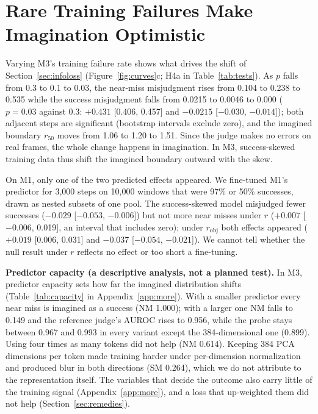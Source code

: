 \documentclass[10pt]{article}
\newcommand{\rob}{r_{\mathrm{obj}}}
\begin{document}
\section{Rare Training Failures Make Imagination Optimistic}
\label{sec:skew}

Varying M3's training failure rate shows what drives the shift of Section~\ref{sec:infoloss} (Figure~\ref{fig:curves}c; H4a in Table~\ref{tab:tests}). As $p$ falls from 0.3 to 0.1 to 0.03, the near-miss misjudgment rises from 0.104 to 0.238 to 0.535 while the success misjudgment falls from 0.0215 to 0.0046 to 0.000 ($p=0.03$ against 0.3: $+0.431$ [0.406, 0.457] and $-0.0215$ [$-0.030$, $-0.014$]); both adjacent steps are significant (bootstrap intervals exclude zero), and the imagined boundary $r_{50}$ moves from 1.06 to 1.20 to 1.51. Since the judge makes no errors on real frames, the whole change happens in imagination. In M3, success-skewed training data thus shift the imagined boundary outward with the skew.

On M1, only one of the two predicted effects appeared. We fine-tuned M1's predictor for 3,000 steps on 10,000 windows that were 97\% or 50\% successes, drawn as nested subsets of one pool. The success-skewed model misjudged fewer successes ($-0.029$ [$-0.053$, $-0.006$]) but not more near misses under $r$ ($+0.007$ [$-0.006$, 0.019], an interval that includes zero); under $\rob$ both effects appeared ($+0.019$ [0.006, 0.031] and $-0.037$ [$-0.054$, $-0.021$]). We cannot tell whether the null result under $r$ reflects no effect or too short a fine-tuning.

\textbf{Predictor capacity (a descriptive analysis, not a planned test).} In M3, predictor capacity sets how far the imagined distribution shifts (Table~\ref{tab:capacity} in Appendix~\ref{app:more}). With a smaller predictor every near miss is imagined as a success (NM 1.000); with a larger one NM falls to 0.149 and the reference judge's AUROC rises to 0.956, while the probe stays between 0.967 and 0.993 in every variant except the 384-dimensional one (0.899). Using four times as many tokens did not help (NM 0.614). Keeping 384 PCA dimensions per token made training harder under per-dimension normalization and produced blur in both directions (SM 0.264), which we do not attribute to the representation itself. The variables that decide the outcome also carry little of the training signal (Appendix~\ref{app:more}), and a loss that up-weighted them did not help (Section~\ref{sec:remedies}).
\end{document}
